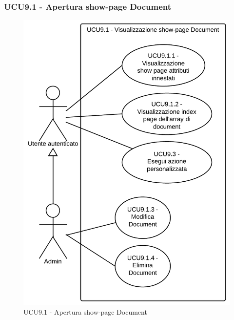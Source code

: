 \subsubsection{UCU9.1 - Apertura show-page Document}    
    \begin{figure}[H]
      \begin{center}
      \includegraphics[scale=0.16]{UML/UCU9.1 - Apertura show-page Document.png}
      \caption{UCU9.1 - Apertura show-page Document}
      \end{center} 
    \end{figure}    
    
